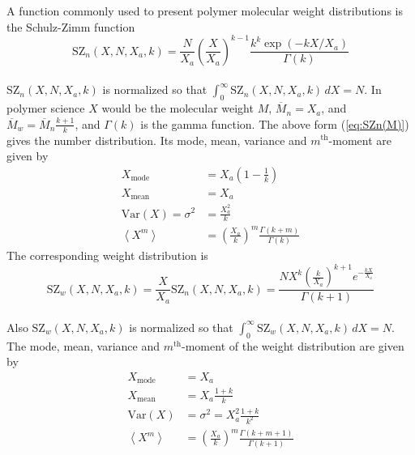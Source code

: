 A function commonly used to present polymer molecular weight distributions is the Schulz-Zimm function
\begin{equation}
\textrm{SZ}_n(X,N,X_a,k) =  \frac{N}{X_a}
\left(\frac{X}{X_a}\right)^{k-1}
\frac{k^k\exp(-kX/X_a)}{\Gamma(k)}
\label{eq:SZn(M)}
\end{equation}
~\\
$\text{SZ}_n(X,N,X_a,k)$ is normalized so that $\int_0^\infty\!
\text{SZ}_n(X,N,X_a,k)\,dX = N$.
In polymer science $X$ would be the molecular weight $M$,
$\overline{M}_n=X_a$, and $\overline{M}_w=\overline{M}_n\frac{k+1}{k}$,
and $\Gamma(k)$ is the gamma function.
The above form (\ref{eq:SZn(M)}) gives the number distribution.
Its mode, mean, variance and $m^\textrm{th}$-moment are given by
\begin{subequations}
\begin{align}
X_\textrm{mode} &= X_a \left(1-\frac{1}{k}\right)\\
X_\textrm{mean} &= X_a \\
\textrm{Var}\left(X\right)=\sigma^2 &= \frac{X_a^2}{k} \\
\left\langle X^m \right\rangle &=
\left(\frac{X_a}{k}\right)^m  \frac{\Gamma \left(k+m\right)}{\Gamma (k)}
\label{eq:SZstatparam}
\end{align}
\end{subequations}
The corresponding weight distribution is
\begin{equation}
\textrm{SZ}_w(X,N,X_a,k) = \frac{X}{X_a}\textrm{SZ}_n(X,N,X_a,k)
=  \frac{N X^k \left(\frac{k}{X_a}\right)^{k+1} e^{-\frac{kX}{X_a}}}{\Gamma(k+1)}
\end{equation}
~\\
Also $\textrm{SZ}_w(X,N,X_a,k)$ is normalized so that $\int_0^\infty\!
\textrm{SZ}_w(X,N,X_a,k)\,dX = N$.
The mode, mean, variance and
$m^\textrm{th}$-moment of the weight distribution are given by
\begin{subequations}
\begin{align}
X_\textrm{mode} &= X_a\\
X_\textrm{mean} &= X_a \frac{1+k}{k}\\
\textrm{Var}\left(X\right)&=\sigma^2 = X_a^2\frac{1+k}{k^2} \\
\left\langle X^m \right\rangle &=
\left(\frac{X_a}{k}\right)^m  \frac{\Gamma \left(k+m+1\right)}{\Gamma \left(k+1\right)}
\label{eq:SZFstatparam}
\end{align}
\end{subequations}



